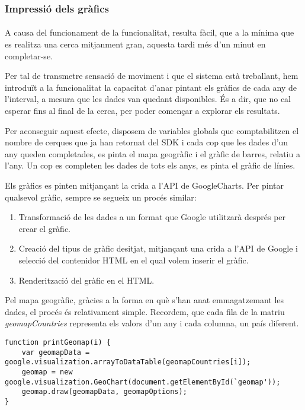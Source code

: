 \subsubsection{Impressió dels gràfics}

\paragraph{}
A causa del funcionament de la funcionalitat, resulta fàcil, que a la mínima que es realitza una cerca mitjanment gran, aquesta tardi més d'un minut en completar-se.

Per tal de transmetre sensació de moviment i que el sistema està treballant, hem introduït a la funcionalitat la capacitat d'anar pintant els gràfics de cada any de l'interval, a mesura que les dades van quedant disponibles. És a dir, que no cal esperar fins al final de la cerca, per poder començar a explorar els resultats.

Per aconseguir aquest efecte, disposem de variables globals que comptabilitzen el nombre de cerques que ja han retornat del SDK i cada cop que les dades d'un any queden completades, es pinta el mapa geogràfic i el gràfic de barres, relatiu a l'any. Un cop es completen les dades de tots els anys, es pinta el gràfic de línies.

Els gràfics es pinten mitjançant la crida a l'API de GoogleCharts. Per pintar qualsevol gràfic, sempre se segueix un procés similar:

\begin{enumerate}
    \item Transformació de les dades a un format que Google utilitzarà després per crear el gràfic.
    \item Creació del tipus de gràfic desitjat, mitjançant una crida a l'API de Google i selecció del contenidor HTML en el qual volem inserir el gràfic.
    \item Renderització del gràfic en el HTML.
\end{enumerate}

Pel mapa geogràfic, gràcies a la forma en què s’han anat emmagatzemant les dades, el procés és relativament simple. Recordem, que cada fila de la matriu \emph{geomap\-Countries} representa els valors d’un any i cada columna, un país diferent.

\begin{lstlisting}[style=rawOwn,caption={Creació del mapa geogràfic}]
function printGeomap(i) {
    var geomapData = google.visualization.arrayToDataTable(geomapCountries[i]);
    geomap = new google.visualization.GeoChart(document.getElementById(`geomap'));
    geomap.draw(geomapData, geomapOptions);
}
\end{lstlisting}

